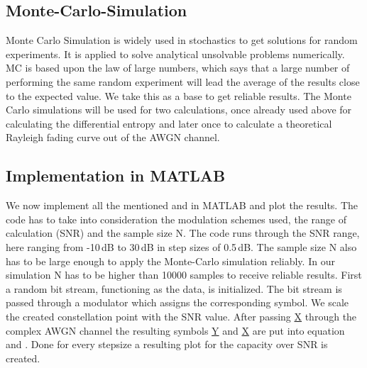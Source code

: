 \subsection{Monte-Carlo-Simulation}
\label{sec:MCS}
Monte Carlo Simulation is widely used in stochastics to get solutions for random experiments. It is applied to solve analytical unsolvable problems numerically. MC is based upon the law of large numbers, which says that a large number of performing the same random experiment will lead the average of the results close to the expected value. We take this as a base to get reliable results. The Monte Carlo simulations will be used for two calculations, once already used above for calculating the differential entropy and later once to calculate a theoretical Rayleigh fading curve out of the AWGN channel. 

\subsection{Implementation in MATLAB}
\label{AWGNMAT}
We now implement all the mentioned  and  in MATLAB and plot the results. The code has to take into consideration the modulation schemes used, the range of calculation (SNR) and the sample size N. The code runs through the SNR range, here ranging from -10\,dB to 30\,dB in step sizes of 0.5\,dB. The sample size N also has to be large enough to apply the Monte-Carlo simulation reliably. In our simulation N has to be higher than 10000 samples to receive reliable results. First a random bit stream, functioning as the data, is initialized. The bit stream is passed through a modulator which assigns the corresponding symbol. We scale the created constellation point with the SNR value. After passing \underline{X} through the complex AWGN channel the resulting symbols \underline{Y} and \underline{X} are put into equation  and . Done for every stepsize a resulting plot for the capacity over SNR is created.  
    

